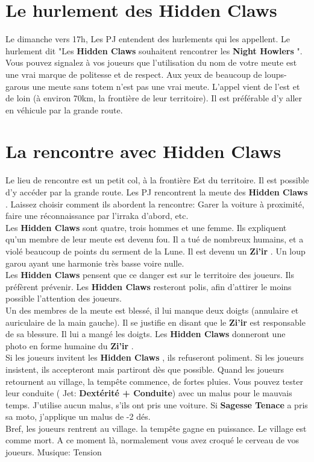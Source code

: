 \documentclass[oneside,12pt]{book}
\newcommand\roll[1]{
( Jet: \textbf{#1})
}
\newcommand{\Jessica}{\textbf{Sagesse Tenace} }
\newcommand{\Thomas}{\textbf{Zi'ir} }
\newcommand{\Night}{\textbf{Night Howlers} }
\newcommand{\Hidden}{\textbf{Hidden Claws} }
\begin{document}
\begin{flushleft}
\section{Le hurlement des \Hidden}
Le dimanche vers 17h, Les PJ entendent des hurlements qui les appellent.  
Le hurlement dit "Les \Hidden souhaitent rencontrer les \Night ". Vous pouvez signalez à vos joueurs que l'utilisation du nom de votre meute est une vrai marque de politesse et de respect. Aux yeux de beaucoup de loups-garous une meute sans totem n'est pas une vrai meute. 
L'appel vient de l'est et de loin (à environ 70km, la frontière de leur territoire). Il est préférable d'y aller en véhicule par la grande route.

\section{La rencontre avec \Hidden}
Le lieu de rencontre est un petit col, à la frontière Est du territoire. 
Il est possible d'y accéder par la grande route.
Les PJ rencontrent la meute des \Hidden. Laissez choisir comment ils abordent la rencontre: 
Garer la voiture à proximité, faire une réconnaissance par l'irraka d'abord, etc.\\ 
Les \Hidden sont quatre, trois hommes et une femme.
Ils expliquent qu'un membre de leur meute est devenu fou. 
Il a tué de nombreux humains, et a violé beaucoup de points du serment de la Lune. 
Il est devenu un \Thomas. Un loup garou ayant une harmonie très basse voire nulle. \\
Les \Hidden pensent que ce danger est sur le territoire des joueurs. Ils préfèrent prévenir. 
Les \Hidden resteront polis, afin d'attirer le moins possible l'attention des joueurs. \\
Un des membres de la meute est blessé, il lui manque deux doigts (annulaire et auriculaire de la main gauche). 
Il se justifie en disant que le \Thomas est responsable de sa blessure. Il lui a mangé les doigts. 
Les \Hidden donneront une photo en forme humaine du \Thomas.\\
Si les joueurs invitent les \Hidden, ils refuseront poliment. 
Si les joueurs insistent, ils accepteront mais partiront dès que possible.
Quand les joueurs retournent au village, la tempête commence, de fortes pluies. 
Vous pouvez tester leur conduite \roll{Dextérité + Conduite} avec un malus pour le mauvais temps. 
J'utilise aucun malus, s'ils ont pris une voiture. Si \Jessica a pris sa moto, j'applique un malus de -2 dés.\\
Bref, les joueurs rentrent au village. la tempête gagne en puissance. 
Le village est comme mort. A ce moment là, normalement vous avez croqué le cerveau de vos joueurs.  
Musique: Tension



\end{flushleft}
\end{document}
